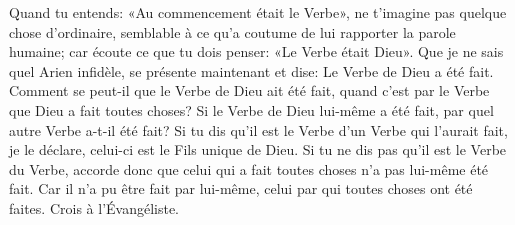 Quand tu entends: «Au commencement était le Verbe»,
	ne t’imagine pas quelque chose d’ordinaire,
	semblable à ce qu’a coutume de lui rapporter la parole humaine;
	car écoute ce que tu dois penser:
	«Le Verbe était Dieu».
Que je ne sais quel Arien infidèle, se présente maintenant et dise:
	Le Verbe de Dieu a été fait.
Comment se peut-il que le Verbe de Dieu ait été fait,
	quand c’est par le Verbe que Dieu a fait toutes choses?
Si le Verbe de Dieu lui-même a été fait,
	par quel autre Verbe a-t-il été fait?
Si tu dis qu’il est le Verbe d’un Verbe qui l’aurait fait,
	je le déclare, celui-ci est le Fils unique de Dieu.
Si tu ne dis pas qu’il est le Verbe du Verbe,
	accorde donc que celui qui a fait toutes choses n’a pas lui-même été fait.
Car il n’a pu être fait par lui-même,
	celui par qui toutes choses ont été faites.
Crois à l’Évangéliste.

